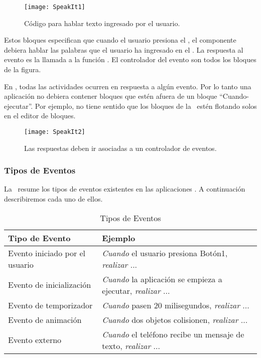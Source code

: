\begin{figure}[H]
\centering
\texttt{[image: SpeakIt1]}
\caption{Código para hablar texto ingresado por el usuario.}
\label{fig:speakit1}
\end{figure}

Estos bloques especifican que cuando el usuario presiona el
, el componente  debiera hablar
las palabras que el usuario ha ingresado en el
. La respuesta al evento
 es la llamada a la función
. El controlador del evento son todos los
bloques de la figura.

En \AppInventor, todas las actividades ocurren en respuesta a algún
evento. Por lo tanto una aplicación no debiera contener bloques que
estén afuera de un bloque “Cuando-ejecutar”. Por ejemplo, no tiene
sentido que los bloques de la~ estén flotando solos
en el editor de bloques.

\begin{figure}[H]
\centering
\texttt{[image: SpeakIt2]}
\caption{Las respuestas deben ir asociadas a un controlador de eventos.}
\label{fig:speakit2}
\end{figure}

\subsubsection*{Tipos de Eventos}

La~ resume los tipos de eventos existentes en las
aplicaciones \AppInventor. A continuación describiremos cada uno de
ellos.

\begin{table}[H]
\begin{small}
\begin{tabular}{|l|l|}
  \hline
  \textbf{Tipo de Evento} & \textbf{Ejemplo}\\
  \hline
  Evento iniciado por el usuario & \emph{Cuando} el usuario presiona
  Botón1, \emph{realizar} ...\\
  \hline
  Evento de inicialización & \emph{Cuando} la aplicación se empieza a
  ejecutar, \emph{realizar} ...\\
  \hline
  Evento de temporizador & \emph{Cuando} pasen 20 milisegundos,
  \emph{realizar} ...\\
\hline
Evento de animación & \emph{Cuando} dos objetos colisionen,
\emph{realizar} ...\\
\hline
Evento externo & \emph{Cuando} el teléfono recibe un mensaje de texto,
\emph{realizar} ...\\
\hline
\end{tabular}
\end{small}
\caption{Tipos de Eventos}
\label{fig:eventTypes}
\end{table}

